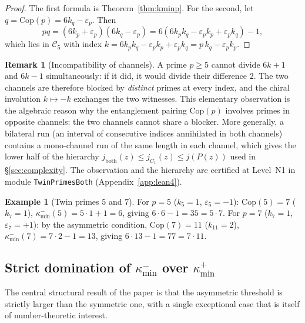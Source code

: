 \documentclass[11pt]{amsart}
\numberwithin{equation}{section}
\newcommand{\kminp}{\kappa_{\min}^{+}}
\newcommand{\kminm}{\kappa_{\min}^{-}}
\newcommand{\Cfive}{\mathcal{C}_5}
\newcommand{\Cop}{\mathrm{Cop}}
\theoremstyle{plain}
\theoremstyle{definition}
\newtheorem{example}[theorem]{Example}
\newtheorem{remark}[theorem]{Remark}
\begin{document}
\begin{proof}
The first formula is Theorem~\ref{thm:kminp}. For the second, let
$q=\Cop(p)=6k_q-\varepsilon_p$. Then
\begin{equation*}
pq=(6k_p+\varepsilon_p)(6k_q-\varepsilon_p)
=6(6k_pk_q-\varepsilon_pk_p+\varepsilon_pk_q)-1,
\end{equation*}
which lies in $\Cfive$ with index
$k=6k_pk_q-\varepsilon_pk_p+\varepsilon_pk_q=p\,k_q-\varepsilon_pk_p$.
\end{proof}

\begin{remark}[Incompatibility of channels]
\label{rem:incompatible-channels}
A prime $p\ge 5$ cannot divide $6k+1$ and $6k-1$ simultaneously: if it
did, it would divide their difference $2$. The two channels are
therefore blocked by \emph{distinct} primes at every index, and the
chiral involution $k\mapsto -k$ exchanges the two witnesses. This
elementary observation is the algebraic reason why the entanglement
pairing $\Cop(p)$ involves primes in opposite channels: the two
channels cannot share a blocker. More generally, a bilateral run (an
interval of consecutive indices annihilated in both channels) contains
a mono-channel run of the same length in each channel, which gives the
lower half of the hierarchy
$j_{\mathrm{both}}(z)\le j_{C_1}(z)\le j(P(z))$ used in
\S\ref{sec:complexity}. The observation and the hierarchy are
certified at Level~N1 in module \texttt{TwinPrimesBoth}
(Appendix~\ref{app:lean4}).
\end{remark}

\begin{example}[Twin primes $5$ and $7$]
\label{ex:twin-5-7}
For $p=5$ ($k_5=1$, $\varepsilon_5=-1$): $\Cop(5)=7$ ($k_7=1$),
$\kminm(5)=5\cdot 1+1=6$, giving $6\cdot 6-1=35=5\cdot 7$.
For $p=7$ ($k_7=1$, $\varepsilon_7=+1$): by the asymmetric condition,
$\Cop(7)=11$ ($k_{11}=2$), $\kminm(7)=7\cdot 2-1=13$, giving
$6\cdot 13-1=77=7\cdot 11$.
\end{example}

\subsection{Strict domination of \texorpdfstring{$\kminm$ over $\kminp$}{k\_min- over k\_min+}}
\label{subsec:domination}

The central structural result of the paper is that the asymmetric
threshold is strictly larger than the symmetric one, with a single
exceptional case that is itself of number-theoretic interest.
\end{document}
